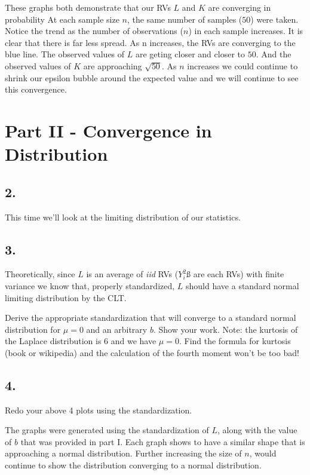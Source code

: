 \documentclass[12pt]{article}
\begin{document}
These graphs both demonstrate that our RVs $L$ and $K$ are converging in probability At each sample size $n$, the same number of samples ($50$) were taken.  Notice the trend as the number of observations ($n$) in each sample increases. It is clear that there is far less spread. As n increases, the RVs are converging to the blue line. The observed values of $L$ are geting closer and closer to $50$. And the observed values of $K$ are approaching $\sqrt{50}$.  As $n$ increases we could continue to shrink our epsilon bubble around the expected value and we will continue to see this convergence.


\section{Part II - Convergence in Distribution}

\subsection{2.}
This time we’ll look at the limiting distribution of our statistics.

\subsection{3.}
Theoretically, since $L$ is an average of \textit{iid} RVs ($Y_i^2$ß are each RVs) with finite variance
we know that, properly standardized, $L$ should have a standard normal limiting distribution by the CLT. 

Derive the appropriate standardization that will converge to a standard normal distribution for $\mu = 0$ and an arbitrary $b$. Show your work. Note: the kurtosis of the
Laplace distribution is 6 and we have $\mu = 0$. Find the formula for kurtosis (book or
wikipedia) and the calculation of the fourth moment won’t be too bad!

\subsection{4.}
Redo your above 4 plots using the standardization.

The graphs were generated using the standardization of $L$, along with the value of $b$ that was provided in part I. Each graph shows to have a similar shape that is approaching a normal distribution. Further increasing the size of $n$, would continue to show the distribution converging to a normal distribution. 
\end{document}
